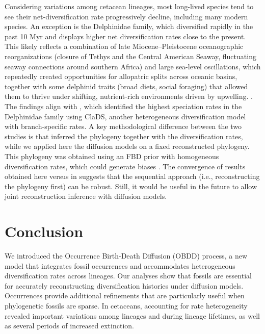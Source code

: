 \documentclass[oupdraft]{sysbio}
\begin{document}
Considering variations among cetacean lineages, most long-lived species tend to see their net-diversification rate progressively decline, including many modern species. An exception is the Delphinidae family, which diversified rapidly in the past 10 Myr and displays higher net diversification rates close to the present. This likely reflects a combination of late Miocene–Pleistocene oceanographic reorganizations (closure of Tethys and the Central American Seaway, fluctuating seaway connections around southern Africa) and large sea-level oscillations, which repeatedly created opportunities for allopatric splits across oceanic basins, together with some delphinid traits (broad diets, social foraging) that allowed them to thrive under shifting, nutrient-rich environments driven by upwelling. \citep{gowans_social_2007, steeman_radiation_2009, do_amaral_historical_2018}. The findings align with \citet{barido-sottani_clads_2023}, which identified the highest speciation rates in the Delphinidae family using ClaDS, another heterogeneous diversification model with branch-specific rates. A key methodological difference between the two studies is that \citet{barido-sottani_clads_2023} inferred the phylogeny together with the diversification rates, while we applied here the diffusion models on a fixed reconstructed phylogeny. This phylogeny was obtained using an FBD prior with homogeneous diversification rates, which could generate biases \citet{barido-sottani_clads_2023}. The convergence of results obtained here versus in \citet{barido-sottani_clads_2023} suggests that the sequential approach (i.e., reconstructing the phylogeny first) can be robust. Still, it would be useful in the future to allow joint reconstruction inference with diffusion models.

\section{Conclusion}

We introduced the Occurrence Birth-Death Diffusion (OBDD) process, a new model that integrates fossil occurrences and accommodates heterogeneous diversification rates across lineages. Our analyses show that fossils are essential for accurately reconstructing diversification histories under diffusion models. Occurrences provide additional refinements that are particularly useful when phylogenetic fossils are sparse. In cetaceans, accounting for rate heterogeneity revealed important variations among lineages and during lineage lifetimes, as well as several periods of increased extinction.
\end{document}
